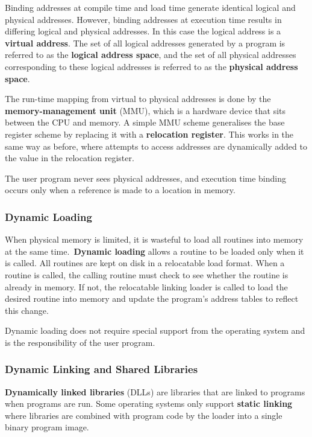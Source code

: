 \documentclass{article}
\begin{document}
Binding addresses at compile time and load time generate identical
logical and physical addresses. However, binding addresses at execution
time results in differing logical and physical addresses. In this case
the logical address is a \textbf{virtual address}. The set of all
logical addresses generated by a program is referred to as the
\textbf{logical address space}, and the set of all physical addresses
corresponding to these logical addresses is referred to as the
\textbf{physical address space}.

The run-time mapping from virtual to physical addresses is done by the
\textbf{memory-management unit} (MMU), which is a hardware device that
sits between the CPU and memory. A simple MMU scheme generalises the
base register scheme by replacing it with a \textbf{relocation
register}. This works in the same way as before, where attempts to
access addresses are dynamically added to the value in the relocation
register.

The user program never sees physical addresses, and execution time
binding occurs only when a reference is made to a location in memory.
\subsubsection{Dynamic Loading}
When physical memory is limited, it is wasteful to load all routines
into memory at the same time.\ \textbf{Dynamic loading} allows a
routine to be loaded only when it is called. All routines are kept on
disk in a relocatable load format. When a routine is called, the
calling routine must check to see whether the routine is already in
memory. If not, the relocatable linking loader is called to load the
desired routine into memory and update the program's address tables to
reflect this change.

Dynamic loading does not require special support from the operating
system and is the responsibility of the user program.
\subsubsection{Dynamic Linking and Shared Libraries}
\textbf{Dynamically linked libraries} (DLLs) are libraries that are
linked to programs when programs are run. Some operating systems only
support \textbf{static linking} where libraries are combined
with program code by the loader into a single binary program image.
\end{document}
